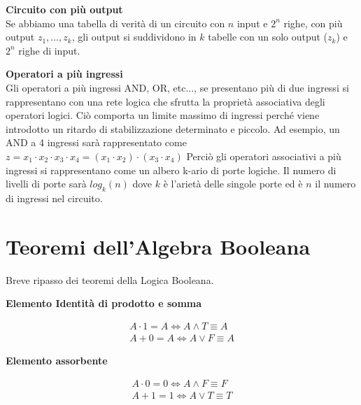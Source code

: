 \begin{defn}
	\textbf{Circuito con più output} \\ 
	Se abbiamo una tabella di verità di un circuito con $ n $ input e $ 2^n $ righe, con più output $ z_1, \dots, z_k $, gli output si suddividono in $ k $ tabelle con un solo output ($ z_k $) e $ 2^n $ righe di input.
\end{defn}

\begin{defn}
	\textbf{Operatori a più ingressi} \\ 
	Gli operatori a più ingressi AND, OR, etc..., se presentano più di due ingressi si rappresentano con una rete logica che sfrutta la proprietà associativa degli operatori logici. Ciò comporta un limite massimo di ingressi perché viene introdotto un ritardo di stabilizzazione determinato e piccolo.
	Ad esempio, un AND a 4 ingressi sarà rappresentato come $ z = x_1 \cdot x_2 \cdot x_3 \cdot x_4 = (x_1 \cdot x_2 ) \cdot (x_3 \cdot x_4)  $
	Perciò gli operatori associativi a più ingressi si rappresentano come un albero k-ario di porte logiche. Il numero di livelli di porte sarà $ log_k(n) $ dove $ k $ è l'arietà delle singole porte ed è $ n $ il numero di ingressi nel circuito.
\end{defn}


\section{Teoremi dell'Algebra Booleana}
Breve ripasso dei teoremi della Logica Booleana.

\begin{thm}
	\textbf{Elemento Identità di prodotto e somma}
	
	\begin{equation*}\begin{aligned}
		A \cdot 1 = A \iff A \land T \equiv A \\
		A + 0 = A \iff A \lor F \equiv A
	\end{aligned}\end{equation*}
\end{thm}

\begin{thm}
	\textbf{Elemento assorbente}
	
	\begin{equation*}\begin{aligned}
		A \cdot 0 = 0 \iff A \land F \equiv F \\
		A + 1 = 1 \iff A \lor T \equiv T 
	\end{aligned}\end{equation*}
\end{thm}

